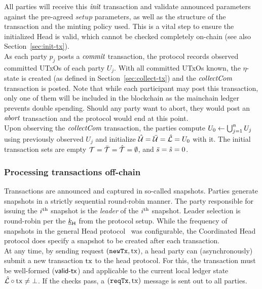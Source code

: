 \quad All parties will receive this $\textit{init}$
transaction and validate announced parameters against the pre-agreed $setup$
parameters, as well as the structure of the transaction and the minting policy
used. This is a vital step to ensure the initialized Head is valid, which
cannot be checked completely on-chain (see also Section~\ref{sec:init-tx}). \\

\quad As each party $p_{j}$ posts a
$\textit{commit}$ transaction, the protocol records observed committed UTxOs of each
party $U_j$. With all committed UTxOs known, the $\eta$-state is created (as
defined in Section~\ref{sec:collect-tx}) and the $\textit{collectCom}$ transaction is
posted. Note that while each participant may post this transaction, only one of
them will be included in the blockchain as the mainchain ledger prevents double
spending. Should any party want to abort, they would post an $\textit{abort}$
transaction and the protocol would end at this point.\\

\quad Upon observing the $\textit{collectCom}$
transaction, the parties compute $U_{0} \gets \bigcup_{j=1}^{n} U_j$ using
previously observed $U_j$ and initialize $\hat {\mathcal U} = \bar {\mathcal U} = \hat {\mathcal L} = U_{0}$
with it. The initial transaction sets are
empty ${\mathcal T} = \bar {\mathcal T} =\hat {\mathcal T} =\emptyset$, and $\bar s = \hat s = 0$.

\subsubsection{Processing transactions off-chain}

Transactions are announced and captured in so-called snapshots. Parties generate
snapshots in a strictly sequential round-robin manner. The party responsible for
issuing the $i^{\text{th}}$ snapshot is the \emph{leader} of the $i^{\text{th}}$ snapshot.
Leader selection is round-robin per the $\underline{k}_{\mathsf{H}}$ from the protocol
setup. While the
frequency of snapshots in the general Head protocol~\cite{hydrahead20} was
configurable, the Coordinated Head protocol does specify a snapshot to be
created after each transaction.\\

\quad At any time, by sending request $(\mathtt{newTx},\mathrm{tx})$, a
head party can (asynchronously) submit a new transaction $\mathrm{tx}$ to the head
protocol. For this, the transaction must be well-formed ($\mathsf{valid\textsf{-}{}tx}$) and applicable to the current local ledger state
$\hat {\mathcal L} \circ \mathrm{tx} \neq \bot$. If the checks
pass, a $(\mathtt{reqTx},\mathrm{tx})$ message is sent out to all parties.\\

